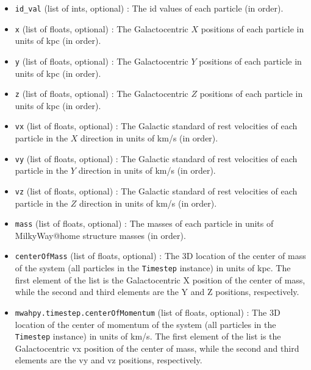 \documentclass{article}
\begin{document}
\begin{itemize}

\item \verb!id_val! (list of ints, optional) : The id values of each particle (in order).

\item \verb!x! (list of floats, optional) : The Galactocentric $X$ positions of each particle in units of kpc (in order).

\item \verb!y! (list of floats, optional) : The Galactocentric $Y$ positions of each particle in units of kpc (in order).

\item \verb!z! (list of floats, optional) : The Galactocentric $Z$ positions of each particle in units of kpc (in order).

\item \verb!vx! (list of floats, optional) : The Galactic standard of rest velocities of each particle in the $X$ direction in units of km/s (in order).

\item \verb!vy! (list of floats, optional) : The Galactic standard of rest velocities of each particle in the $Y$ direction in units of km/s (in order).

\item \verb!vz! (list of floats, optional) : The Galactic standard of rest velocities of each particle in the $Z$ direction in units of km/s (in order).

\item \verb!mass! (list of floats, optional) : The masses of each particle in units of MilkyWay@home structure masses (in order).

\item \verb!centerOfMass! (list of floats, optional) : The 3D location of the center of mass of the system (all particles in the \verb!Timestep! instance) in units of kpc. The first element of the list is the Galactocentric X position of the center of mass, while the second and third elements are the Y and Z positions, respectively.

\item \verb!mwahpy.timestep.centerOfMomentum! (list of floats, optional) : The 3D location of the center of momentum of the system (all particles in the \verb!Timestep! instance) in units of km/s. The first element of the list is the Galactocentric vx position of the center of mass, while the second and third elements are the vy and vz positions, respectively.


\end{itemize}
\end{document}
